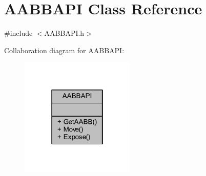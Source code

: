 \hypertarget{class_a_a_b_b_a_p_i}{}\section{A\+A\+B\+B\+A\+PI Class Reference}
\label{class_a_a_b_b_a_p_i}


{\ttfamily \#include $<$A\+A\+B\+B\+A\+P\+I.\+h$>$}



Collaboration diagram for A\+A\+B\+B\+A\+PI\+:\nopagebreak
\begin{figure}[H]
\begin{center}
\leavevmode
\includegraphics[width=154pt]{class_a_a_b_b_a_p_i__coll__graph}
\end{center}
\end{figure}
